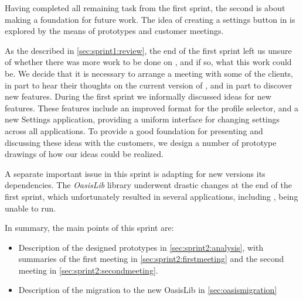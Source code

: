 Having completed all remaining task from the first sprint, the second is about making a foundation for future work.
The idea of creating a settings button in \launcher is explored by the means of prototypes and customer meetings.

As the described in \cref{sec:sprint1:review}, the end of the first sprint left us unsure of whether there was more work to be done on \launcher, and if so, what this work could be. 
We decide that it is necessary to arrange a meeting with some of the clients, in part to hear their thoughts on the current version of \launcher, and in part to discover new features.
During the first sprint we informally discussed ideas for new features.
These features include an improved format for the profile selector, and a new Settings application, providing a uniform interface for changing settings across all applications. 
To provide a good foundation for presenting and discussing these ideas with the customers, we design a number of prototype drawings of how our ideas could be realized.

A separate important issue in this sprint is adapting \launcher for new versions its dependencies. 
The \textit{OasisLib} library underwent drastic changes at the end of the first sprint, which unfortunately resulted in several applications, including \launcher, being unable to run.

In summary, the main points of this sprint are:

\begin{itemize}
\item Description of the designed prototypes in \cref{sec:sprint2:analysis}, with summaries of the first meeting in \cref{sec:sprint2:firstmeeting} and the second meeting in \cref{sec:sprint2:secondmeeting}.
\item Description of the migration to the new OasisLib in \cref{sec:oasismigration}
\end{itemize}